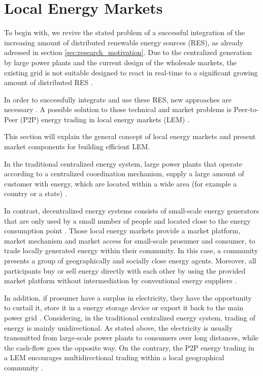 \section{Local Energy Markets}
To begin with, we revive the stated problem of a successful integration of the increasing amount of
distributed renewable energy sources (RES), as already adressed 
in section \ref{sec:research_motivation}. Due to the centralized generation by large power plants
and the current design of the wholesale markets, the existing grid is not suitable designed
to react in real-time to a significant growing 
amount of distributed RES  .

In order to successfully integrate and use these RES, new approaches are necessary .
A possible solution to those technical and market problems is Peer-to-Peer (P2P) energy 
trading in local energy markets (LEM) . 

This section will explain the general concept of local energy markets 
and present market components for building efficient LEM. 

In the traditional centralized energy system, large power plants that operate according to a
centralized coordination mechanism, supply a large amount of customer with energy, which are located 
within a wide area (for example a country or a state) .

In contrast, decentralized energy systems consists of small-scale energy generators that are 
only used by a small number of people and located close to the energy consumption point .
Those local energy markets provide a market platform, market mechanism and market access
for small-scale prosumer and consumer, to trade locally generated energy within their community.
In this case, a community presents a group of geographically and socially close energy agents.
Moreover, all participants buy or sell energy directly with each other by using the provided market platform
without intermediation by conventional energy suppliers .

In addition, if prosumer have a surplus in electricity, they have the opportunity 
to curtail it, store it in a energy storage device or export it back to the main power grid .
Considering, in the traditional centralized energy system, trading of energy is mainly unidirectional.
As stated above, the electricity is usually transmitted from large-scale power plants to 
consumers over long distances, while the cash-flow goes the opposite way. 
On the contrary, the P2P energy trading in a LEM encourages multidirectional trading within 
a local geographical community .

